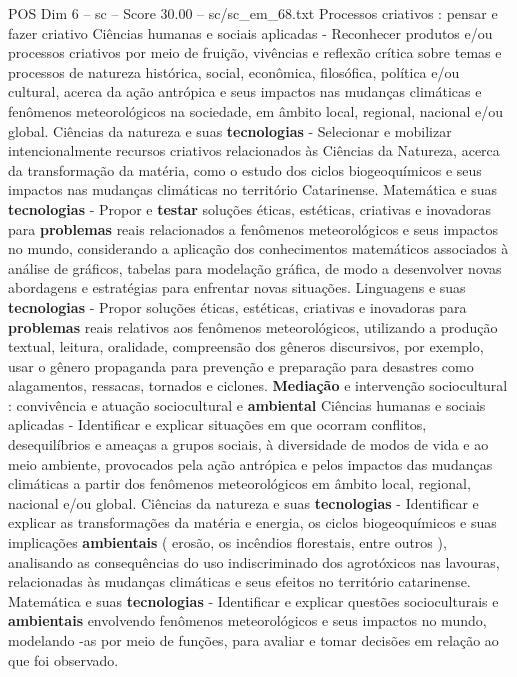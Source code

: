 \begin{textsample}{POS Dim 6 – sc – Score 30.00 – sc/sc\_em\_68.txt}
Processos criativos : pensar e fazer criativo Ciências humanas e sociais aplicadas - Reconhecer produtos e/ou processos criativos por meio de fruição, vivências e reflexão crítica sobre temas e processos de natureza histórica, social, econômica, filosófica, política e/ou cultural, acerca da ação antrópica e seus impactos nas mudanças climáticas e fenômenos meteorológicos na sociedade, em âmbito local, regional, nacional e/ou global.
Ciências da natureza e suas \textbf{tecnologias} - Selecionar e mobilizar intencionalmente recursos criativos relacionados às Ciências da Natureza, acerca da transformação da matéria, como o estudo dos ciclos biogeoquímicos e seus impactos nas mudanças climáticas no território Catarinense.
Matemática e suas \textbf{tecnologias} - Propor e \textbf{testar} soluções éticas, estéticas, criativas e inovadoras para \textbf{problemas} reais relacionados a fenômenos meteorológicos e seus impactos no mundo, considerando a aplicação dos conhecimentos matemáticos associados à análise de gráficos, tabelas para modelação gráfica, de modo a desenvolver novas abordagens e estratégias para enfrentar novas situações.
Linguagens e suas \textbf{tecnologias} - Propor soluções éticas, estéticas, criativas e inovadoras para \textbf{problemas} reais relativos aos fenômenos meteorológicos, utilizando a produção textual, leitura, oralidade, compreensão dos gêneros discursivos, por exemplo, usar o gênero propaganda para prevenção e preparação para desastres como alagamentos, ressacas, tornados e ciclones. \textbf{Mediação} e intervenção sociocultural : convivência e atuação sociocultural e \textbf{ambiental} Ciências humanas e sociais aplicadas - Identificar e explicar situações em que ocorram conflitos, desequilíbrios e ameaças a grupos sociais, à diversidade de modos de vida e ao meio ambiente, provocados pela ação antrópica e pelos impactos das mudanças climáticas a partir dos fenômenos meteorológicos em âmbito local, regional, nacional e/ou global.
Ciências da natureza e suas \textbf{tecnologias} - Identificar e explicar as transformações da matéria e energia, os ciclos biogeoquímicos e suas implicações \textbf{ambientais} ( erosão, os incêndios florestais, entre outros ), analisando as consequências do uso indiscriminado dos agrotóxicos nas lavouras, relacionadas às mudanças climáticas e seus efeitos no território catarinense.
Matemática e suas \textbf{tecnologias} - Identificar e explicar questões socioculturais e \textbf{ambientais} envolvendo fenômenos meteorológicos e seus impactos no mundo, modelando -as por meio de funções, para avaliar e tomar decisões em relação ao que foi observado.

\end{textsample}
